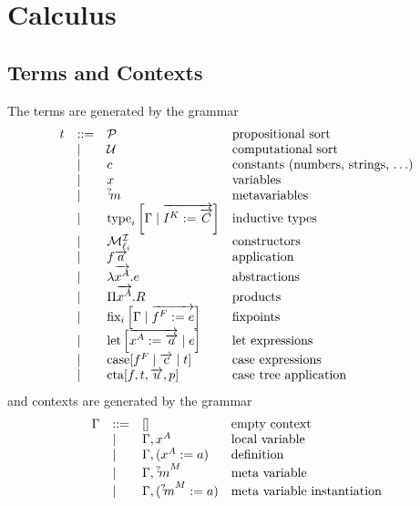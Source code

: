 \section{Calculus}





\subsection{Terms and Contexts}



The terms are generated by the grammar
%
$$
\begin{array}{llll}
    t
    &::=&
    {\cal P}
    &\text{propositional sort}
    \\
    &\mid&
    {\cal U}
    &\text{computational sort}
    \\
    &\mid&
    c
    &\text{constants (numbers, strings, $\ldots$)}
    \\
    &\mid&
    x
    &\text{variables}
    \\
    &\mid&
    {{}^? \kern-0.2em m}
    &\text{metavariables}
    \\
    &\mid&
    {\text{type}}_i\left[ {\Gamma \mid {\overrightarrow {I^K := {\overrightarrow {C}}}}} \right]
    & \text{inductive types}
    \\
    &\mid&
    {\cal M}^{\mathcal I}_{\ell_i}
    &\text{constructors}
    \\
    &\mid&
    f {\overrightarrow {a}}
    & \text{application}
    \\
    &\mid&
    \lambda {\overrightarrow {x^A}}. e
    & \text{abstractions}
    \\
    &\mid&
    \Pi {\overrightarrow {x^A}}. R
    & \text{products}
    \\
    &\mid&
    {\text{fix}}_i\left[ {\Gamma \mid {\overrightarrow { f^F := e}}} \right]
    & \text{fixpoints}
    \\
    &\mid&
    {\text{let}}\left[ {{\overrightarrow { x^A := {\overrightarrow {a}}}} \mid e} \right]
    & \text{let expressions}
    \\
    &\mid&
    {\text{case}}[f^F \mid {\overrightarrow {c}} \mid t]
    & \text{case expressions}
    \\
    &\mid&
    {\text{cta}}[f, t, {\overrightarrow {u}}, p]
    &\text{case tree application}
\end{array}
$$
%
and contexts are generated by the grammar
$$
\begin{array}{llll}
    \Gamma
    &::=&
    []
    &\text{empty context}
    \\
    &\mid&
    \Gamma, x^A
    &\text{local variable}
    \\
    &\mid&
    \Gamma, (x^A := a)
    &\text{definition}
    \\
    &\mid&
    \Gamma, {{}^? \kern-0.2em m}^M
    &\text{meta variable}
    \\
    &\mid&
    \Gamma, ({{}^? \kern-0.2em m}^M := a)
    &\text{meta variable instantiation}
\end{array}
$$







